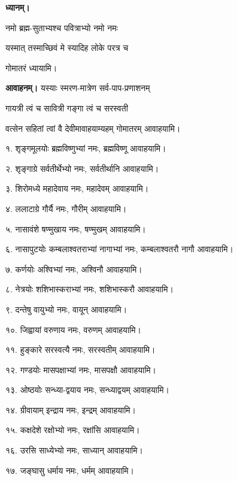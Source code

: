 \begin{center}

\textbf{ध्यानम्।}

{नमो ब्रह्म-सुताभ्यश्च पवित्राभ्यो नमो नमः}

{यस्मात् तस्माच्छिवं मे स्यादिह लोके परत्र च}

गोमातरं ध्यायामि।

\textbf{आवाहनम्।}
{यस्याः स्मरण-मात्रेण सर्व-पाप-प्रणाशनम्}

{गायत्री त्वं च सावित्री गङ्गा त्वं च सरस्वती}

{वत्सेन सहितां त्वां वै देवीमावाहयाम्यहम्}
गोमातरम् आवाहयामि।

\end{center}


१. शृङ्गमूलयोः ब्रह्मविष्णुभ्यां नमः, ब्रह्मविष्णू आवाहयामि।

२. शृङ्गाग्रे सर्वतीर्थेभ्यो नमः, सर्वतीर्थानि आवाहयामि।

३. शिरोमध्ये महादेवाय नमः, महादेवम् आवाहयामि।

४. ललाटाग्रे गौर्यै नमः, गौरीम् आवाहयामि।

५. नासावंशे षण्मुखाय नमः, षण्मुखम् आवाहयामि।

६. नासापुटयोः कम्बलाश्वतराभ्यां नागाभ्यां नमः, कम्बलाश्वतरौ नागौ आवाहयामि।

७. कर्णयोः अश्विभ्यां नमः, अश्विनौ आवाहयामि।

८. नेत्रयोः शशिभास्कराभ्यां नमः, शशिभास्करौ आवाहयामि।

९. दन्तेषु वायुभ्यो नमः, वायून् आवाहयामि।

१०. जिह्वायां वरुणाय नमः, वरुणम् आवाहयामि।

११. हुङ्कारे सरस्वत्यै नमः, सरस्वतीम् आवाहयामि।

१२. गण्डयोः मासपक्षाभ्यां नमः, मासपक्षौ आवाहयामि।

१३. ओष्ठयोः सन्ध्या-द्वयाय नमः, सन्ध्याद्वयम् आवाहयामि।

१४. ग्रीवायाम् इन्द्राय नमः, इन्द्रम् आवाहयामि।

१५. कक्षदेशे रक्षोभ्यो नमः, रक्षांसि आवाहयामि।

१६. उरसि साध्येभ्यो नमः, साध्यान् आवाहयामि।

१७. जङ्घासु धर्माय नमः, धर्मम् आवाहयामि।

